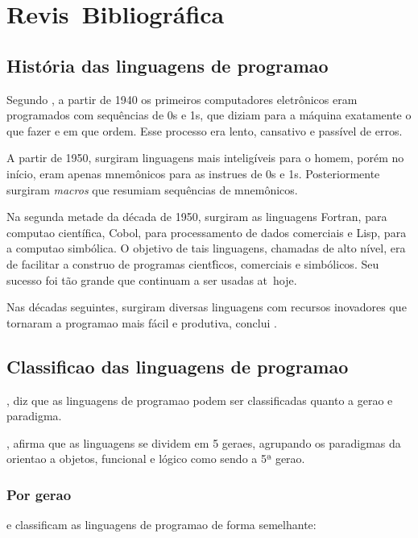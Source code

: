 
\chapter{Revis\ao\ Bibliogr\'afica}
\label{er:revisao}

\section{Hist\'oria das linguagens de programa\ca o}

Segundo \cite{Aho08}, a partir de 1940 os primeiros computadores eletr\^onicos eram programados com sequ\^encias de 0s e 1s, que diziam para a m\'aquina exatamente o que fazer e em que ordem. Esse processo era lento, cansativo e pass\'ivel de erros.

A partir de 1950, surgiram linguagens mais intelig\'iveis para o homem, por\'em no in\'icio, eram apenas mnem\^onicos para as instru\co es de 0s e 1s. Posteriormente surgiram \emph{macros} que resumiam sequ\^encias de mnem\^onicos.

Na segunda metade da d\'ecada de 1950, surgiram as linguagens Fortran, para computa\ca o cient\'ifica, Cobol, para processamento de dados comerciais e Lisp, para a computa\ca o simb\'olica. O objetivo de tais linguagens, chamadas de alto n\'ivel, era de facilitar a constru\ca o de programas cient\'ficos, comerciais e simb\'olicos. Seu sucesso foi t\~ao grande que continuam a ser usadas at\eh\ hoje.

Nas d\'ecadas seguintes, surgiram diversas linguagens com recursos inovadores que tornaram a programa\ca o mais f\'acil e produtiva, conclui \cite{Aho08}.

\section{Classifica\ca o das linguagens de programa\ca o}

\cite{Aho08}, diz que as linguagens de programa\ca o podem ser classificadas quanto a gera\ca o e paradigma.

\cite{MacLennan}, afirma que as linguagens se dividem em 5 gera\co es, agrupando os paradigmas da orienta\ca o a objetos, funcional e l\'ogico como sendo a 5ª gera\ca o.

\subsection{Por gera\ca o}

\cite{Aho08} e \cite{wiki:lingprog} classificam as linguagens de programa\ca o de forma semelhante:


